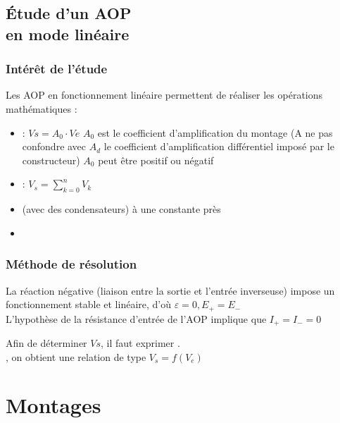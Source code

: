 

\chapter{Étude d’un AOP \\en mode linéaire}
\section{Intérêt de l’étude }

Les AOP en fonctionnement linéaire permettent de réaliser les opérations mathématiques :

\begin{itemize}
  \item {} : $Vs=A_0 \cdot Ve$
  $A_0$ est le coefficient d’amplification du montage (A ne pas confondre avec $A_d$ le coefficient d’amplification différentiel imposé par le constructeur)
  $A_0$ peut être positif ou négatif
  \item {} : $V_s=\sum_{k=0}^{n} V_k$
  \item {} (avec des condensateurs) à une constante près
  \item {}
\end{itemize}

\section{Méthode de résolution}
La {\color{red}réaction négative} (liaison entre la sortie et l’entrée inverseuse) impose un fonctionnement stable et linéaire, d'où {\color{red}$\varepsilon=0, E_+=E_-$} \\

L’hypothèse de la résistance d’entrée de l’AOP implique que $I_+=I_-=0$

Afin de déterminer $Vs$, il faut exprimer . \\

, on obtient une relation de type $V_s = f(V_e)$




 \part{Montages}
